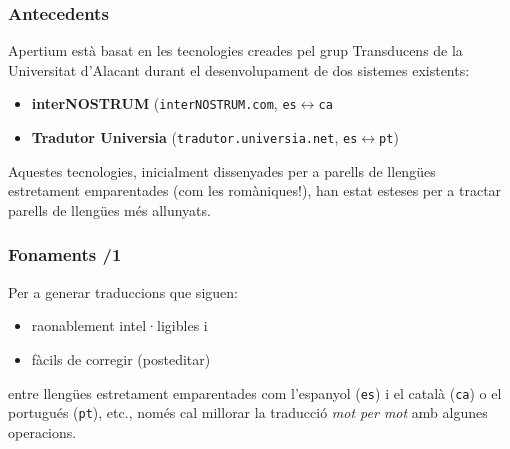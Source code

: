 \documentclass{beamer}
\newcommand{\empha}[1]{\emph{#1}\/}
\begin{document}
\begin{frame}
 \frametitle{Antecedents} 

 Apertium està basat en les tecnologies creades pel grup Transducens
 de la Universitat d'Alacant durant el desenvolupament de dos sistemes
 existents:
 
\begin{itemize}
 
\item \textbf{interNOSTRUM} (\texttt{interNOSTRUM.com},
  \texttt{es}\(\leftrightarrow\)\texttt{ca}%
 
\item \textbf{Tradutor Universia} (\texttt{tradutor.universia.net},
  \texttt{es}\(\leftrightarrow\)\texttt{pt})
 
\end{itemize}

Aquestes tecnologies, inicialment dissenyades per a parells de
llengües estretament emparentades (com les romàniques!), han estat
esteses per a tractar parells de llengües més allunyats.

\end{frame}


\begin{frame}
\frametitle{Fonaments /1}

Per a generar traduccions que siguen: 

\begin{itemize}

\item raonablement intel·ligibles i
\item fàcils de corregir (posteditar)
\end{itemize}
entre llengües estretament emparentades com l'espanyol (\texttt{es}) i
el català (\texttt{ca}) o el portugués (\texttt{pt}), etc., només cal
millorar la traducció \empha{mot per mot} amb algunes operacions.

\end{frame}
\end{document}
